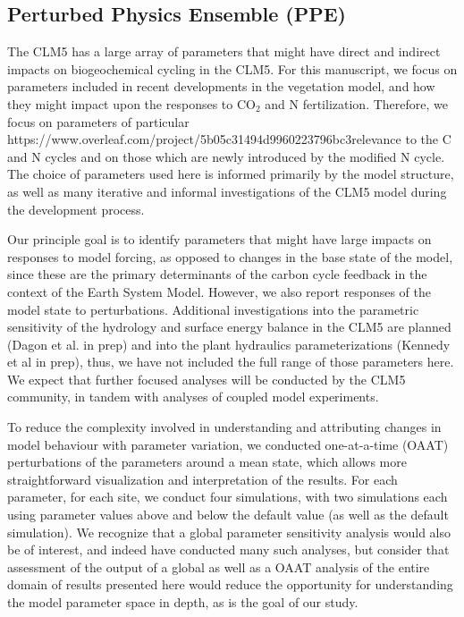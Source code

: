 \documentclass[draft,linenumbers]{agujournal}
\begin{document}
\subsection{Perturbed Physics Ensemble (PPE)}
The CLM5 has a large array of parameters that might have direct and indirect impacts on biogeochemical cycling in the CLM5. For this manuscript, we focus on parameters included in recent developments in the vegetation model, and how they might impact upon the responses to CO$_{2}$ and N fertilization. Therefore, 
we focus on parameters of particular https://www.overleaf.com/project/5b05c31494d9960223796bc3relevance to the C and N cycles and on those which are newly introduced by the modified N cycle. The choice of parameters used here is informed primarily by the model structure, as well as many iterative and informal investigations of the CLM5 model during the development process. 

Our principle goal is to identify parameters that might have large impacts on responses to model forcing, as opposed to changes in the base state of the model, since these are the primary determinants of the carbon cycle feedback in the context of the Earth System Model. However, we also report responses of the model state to perturbations. Additional investigations into the parametric sensitivity of the hydrology and surface energy balance in the CLM5 are planned (Dagon et al. in prep) and into the plant hydraulics parameterizations (Kennedy et al in prep), thus, we have not included the full range of those parameters here. We expect that further focused analyses will be conducted by the CLM5 community, in tandem with analyses of coupled model experiments. 

To reduce the complexity involved in understanding and attributing changes in model behaviour with parameter variation, we conducted one-at-a-time (OAAT) perturbations of the parameters around a mean state, which allows more straightforward visualization and interpretation of the results. For each parameter, for each site, we conduct four simulations, with two simulations each using parameter values above and  below the default value (as well as the default simulation). We recognize that a global parameter sensitivity analysis would also be of interest, and indeed have conducted many such analyses, but consider that assessment of the output of a global as well as a OAAT analysis of the entire domain of results presented here would reduce the opportunity for understanding the model parameter space in depth, as is the goal of our study. 
\end{document}
